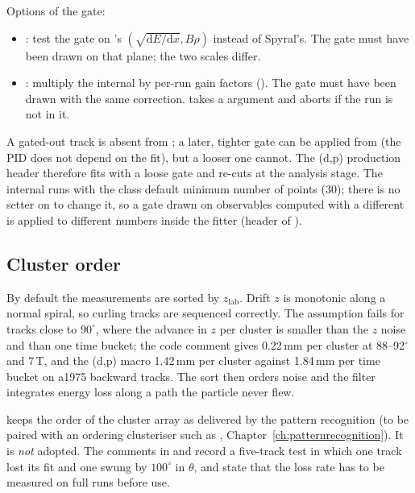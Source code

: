 Options of the gate:
\begin{itemize}
\item {}: test the gate on 's $(\sqrt{\mathrm{d}E/\mathrm{d}x}, B\rho)$
  instead of Spyral's. The gate must have been drawn on that plane; the two \dedx{} scales differ.
\item {}: multiply the internal \sqdedx{} by per-run gain factors
  (). The gate must have been drawn with the same correction.
   takes a  argument and aborts if the run is not in it.
\end{itemize}

A gated-out track is absent from ; a later, tighter gate can be applied from 
(the PID does not depend on the fit), but a looser one cannot. The (d,p) production header therefore fits with a loose
gate and re-cuts at the analysis stage. The internal  runs with the class default minimum number of
points (30); there is no setter on  to change it, so a gate drawn on observables computed with a
different  is applied to different numbers inside the fitter (header of
).

\subsection{Cluster order}
\label{sec:gf-order}

By default the measurements are sorted by $z_\mathrm{lab}$. Drift $z$ is monotonic along a normal spiral, so curling
tracks are sequenced correctly. The assumption fails for tracks close to $90^\circ$, where the advance in $z$ per
cluster is smaller than the $z$ noise and than one time bucket; the code comment gives 0.22\,mm per cluster at
88--92$^\circ$ and 7\,T, and the (d,p) macro 1.42\,mm per cluster against 1.84\,mm per time bucket on a1975 backward
tracks. The sort then orders noise and the filter integrates energy loss along a path the particle never flew.

 keeps the order of the cluster array as delivered by the pattern recognition (to be
paired with an ordering clusteriser such as , Chapter~\ref{ch:patternrecognition}).
It is \emph{not} adopted. The comments in  and  record
a five-track test in which one track lost its fit and one swung by $100^\circ$ in $\theta$, and state that the loss rate
has to be measured on full runs before use.

